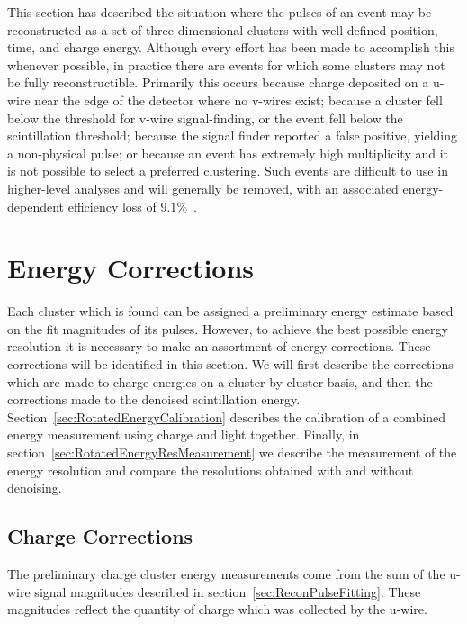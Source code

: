 This section has described the situation where the pulses of an event may be reconstructed as a set of three-dimensional clusters with well-defined position, time, and charge energy.  Although every effort has been made to accomplish this whenever possible, in practice there are events for which some clusters may not be fully reconstructible.  Primarily this occurs because charge deposited on a u-wire near the edge of the detector where no v-wires exist; because a cluster fell below the threshold for v-wire signal-finding, or the event fell below the scintillation threshold; because the signal finder reported a false positive, yielding a non-physical pulse; or because an event has extremely high multiplicity and it is not possible to select a preferred clustering.  Such events are difficult to use in higher-level analyses and will generally be removed, with an associated energy-dependent efficiency loss of $9.1\%$~\cite{NewEXObb0nPaper_2014}.

\section{Energy Corrections}\label{sec:ResultEnergy}

Each cluster which is found can be assigned a preliminary energy estimate based on the fit magnitudes of its pulses.  However, to achieve the best possible energy resolution it is necessary to make an assortment of energy corrections.  These corrections will be identified in this section.  We will first describe the corrections which are made to charge energies on a cluster-by-cluster basis, and then the corrections made to the denoised scintillation energy.  Section~\ref{sec:RotatedEnergyCalibration} describes the calibration of a combined energy measurement using charge and light together.  Finally, in section~\ref{sec:RotatedEnergyResMeasurement} we describe the measurement of the energy resolution and compare the resolutions obtained with and without denoising.

\subsection{Charge Corrections}\label{sec:ResultEnergyCharge}

The preliminary charge cluster energy measurements come from the sum of the u-wire signal magnitudes described in section~\ref{sec:ReconPulseFitting}.  These magnitudes reflect the quantity of charge which was collected by the u-wire.

